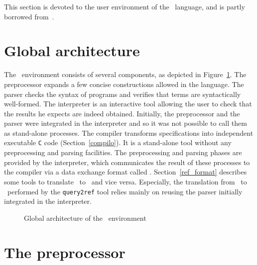 

This section is devoted to the user environment of the \elan{}\
language, and is partly borrowed from~\cite{BorovanskyKKMR-WRLA98}.

\section{Global architecture}

The \elan\ environment consists of several components, as depicted in
Figure~\ref{ELAN-env}. The preprocessor expands a few concise
constructions allowed  in the language.
The parser checks the syntax of programs and verifies that terms are
syntactically well-formed.  The interpreter is an interactive tool
allowing the user to check that the results he expects are indeed
obtained. Initially, the preprocessor and the parser were integrated
in the interpreter and so it was not possible to call them as
stand-alone processes.  The compiler transforms specifications into
independent executable \texttt{C} code (Section~\ref{compilo}). It is
a stand-alone tool without any preprocessing and parsing
facilities. The preprocessing and parsing phases are provided by the
interpreter, which communicates the result of these processes to the
compiler via a data exchange format called \REF. Section~\ref{ref_format}
describes some tools to translate \elan\ to \REF\ and vice versa.
Especially, the translation from \elan\ to \REF\ performed by the 
\texttt{query2ref} tool relies mainly on reusing the parser initially
integrated in the interpreter.

\begin{figure}[ht] %
\centering

\label{ELAN-env}
\caption{Global architecture of the \elan\ environment}
\end{figure}


\section{The preprocessor}

